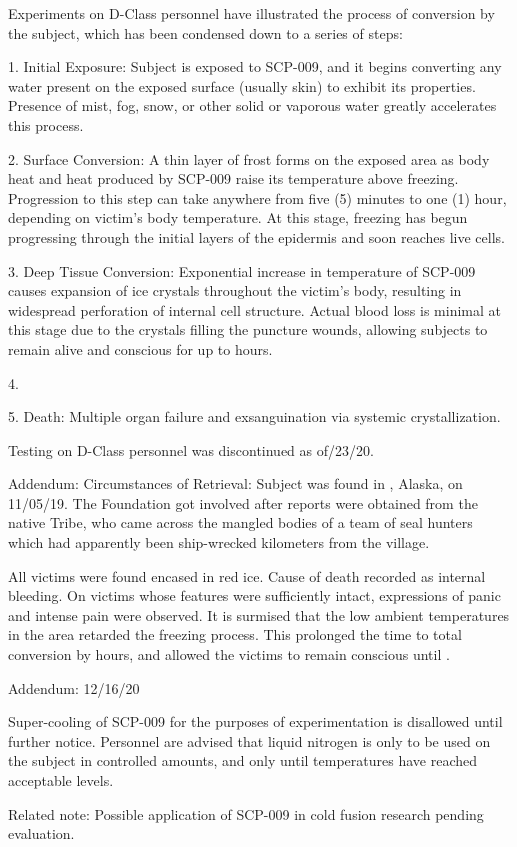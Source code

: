 Experiments on D-Class personnel have illustrated the process of conversion by the subject, which has been condensed down to a series of steps:

1. Initial Exposure: Subject is exposed to SCP-009, and it begins converting any water present on the exposed surface (usually skin) to exhibit its properties. Presence of mist, fog, snow, or other solid or vaporous water greatly accelerates this process.

2. Surface Conversion: A thin layer of frost forms on the exposed area as body heat and heat produced by SCP-009 raise its temperature above freezing. Progression to this step can take anywhere from five (5) minutes to one (1) hour, depending on victim's body temperature. At this stage, freezing has begun progressing through the initial layers of the epidermis and soon reaches live cells.

3. Deep Tissue Conversion: Exponential increase in temperature of SCP-009 causes expansion of ice crystals throughout the victim's body, resulting in widespread perforation of internal cell structure. Actual blood loss is minimal at this stage due to the crystals filling the puncture wounds, allowing subjects to remain alive and conscious for up to  hours.

4. \expunged

5. Death: Multiple organ failure and exsanguination via systemic crystallization.

Testing on D-Class personnel was discontinued as of/23/20.

Addendum: Circumstances of Retrieval: Subject was found in , Alaska, on 11/05/19. The Foundation got involved after reports were obtained from the native  Tribe, who came across the mangled bodies of a team of seal hunters which had apparently been ship-wrecked  kilometers from the village.

All victims were found encased in red ice. Cause of death recorded as internal bleeding. On victims whose features were sufficiently intact, expressions of panic and intense pain were observed. It is surmised that the low ambient temperatures in the area retarded the freezing process. This prolonged the time to total conversion by  hours, and allowed the victims to remain conscious until \expunged.

Addendum: 12/16/20

Super-cooling of SCP-009 for the purposes of experimentation is disallowed until further notice. Personnel are advised that liquid nitrogen is only to be used on the subject in controlled amounts, and only until temperatures have reached acceptable levels.

Related note: Possible application of SCP-009 in cold fusion research pending evaluation.